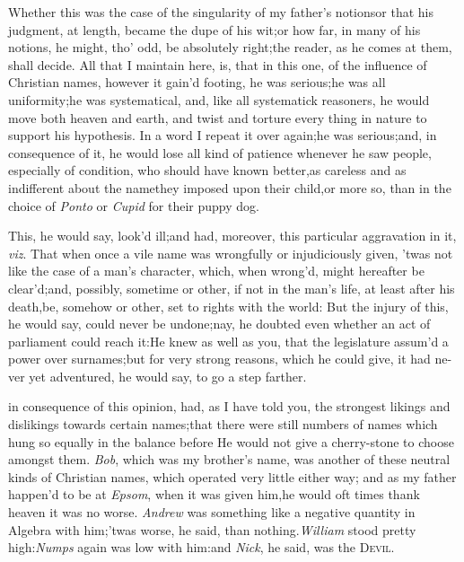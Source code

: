 \documentclass{article}
\begin{document}
\newpage
Whether this was the case of the singularity of my
father’s notions\tsk  or that his judgment, at length,
became the dupe of his wit;\tsk  or how far, in many of his
notions, he might, tho’ odd, be absolutely right;\tsk  the
reader, as he comes at them, shall decide. All that I maintain
here, is, that in this one, of the influence of Christian names,
however it gain’d footing, he was serious;\tsk  he was all
uniformity;\tsk  he was systema\-tical, and, like all systematick
reasoners, he would move both heaven and earth, and twist and
torture every thing in nature to support his hypothesis. In a word
I repeat it over again;\tsk  he was
serious;\tsk  and, in consequence of it, he would lose all kind of
patience whenever he saw people, especially of condition, who
should have known better,\tsh  as careless and as
indifferent about the name\pb they imposed upon their child,\tsk  or
more so, than in the choice of \textit{Ponto} or \textit{Cupid} for
their puppy dog.

This, he would say, look’d ill;\tsk  and had, moreover,
this particular aggravation in it, \textit{viz}. That when once a vile name
was wrongfully or injudiciously given, ’twas not like the
case of a man’s character, which, when wrong’d, might
hereafter be clear’d;\tsh  and, possibly, sometime or
other, if not in the man’s life, at least after his
death,\tsk  be, somehow or other, set to rights with the world:\break
But the injury of this, he would say, could never be
undone;\tsk  nay, he doubt\-ed even whether an act of parliament
could reach it:\tsh  He knew as well as you, that the
legislature assum’d a power over surnames;\tsk  but for very
strong reasons, which he could give, it had ne-\pb ver yet adventured, he would say, to go a step
farther.

\noindent
{} in consequence of
this opinion, had, as I have told you, the strongest likings and
dislikings towards certain names;\tsk  that there were still
numbers of names which hung so equally in the balance before
\pb 
He would not give a cherry-stone to\break
choose amongst them. \textit{Bob}, which was\break
my brother’s name, was another of these neutral kinds of
Christian names, which operated very little either way; and as my
father happen’d to be at \textit{Epsom}, when it was given him,\tsk  he would
oft times thank heaven it was no worse. \textit{Andrew} was something
like a negative quantity in Algebra with him;\tsk  ’twas
worse, he said, than nothing.\tsk  \textit{William} stood pretty
high:\tsh  \textit{Numps} again was low with him:\tsk  and
\textit{Nick}, he said, was the \textsc{Devil}.
\end{document}
